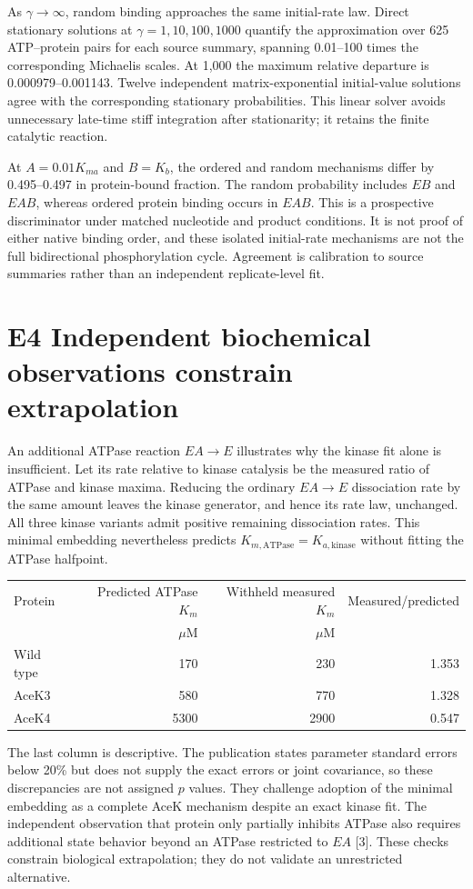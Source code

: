 \documentclass[11pt]{article}
\begin{document}
As $\gamma\to\infty$, random binding approaches the same initial-rate law. Direct stationary solutions at $\gamma=1,10,100,1000$ quantify the approximation over 625 ATP--protein pairs for each source summary, spanning 0.01--100 times the corresponding Michaelis scales. At 1,000 the maximum relative departure is 0.000979--0.001143. Twelve independent matrix-exponential initial-value solutions agree with the corresponding stationary probabilities. This linear solver avoids unnecessary late-time stiff integration after stationarity; it retains the finite catalytic reaction.

At $A=0.01K_{ma}$ and $B=K_b$, the ordered and random mechanisms differ by 0.495--0.497 in protein-bound fraction. The random probability includes $EB$ and $EAB$, whereas ordered protein binding occurs in $EAB$. This is a prospective discriminator under matched nucleotide and product conditions. It is not proof of either native binding order, and these isolated initial-rate mechanisms are not the full bidirectional phosphorylation cycle. Agreement is calibration to source summaries rather than an independent replicate-level fit.

\section*{E4 Independent biochemical observations constrain extrapolation}
An additional ATPase reaction $EA\to E$ illustrates why the kinase fit alone is insufficient. Let its rate relative to kinase catalysis be the measured ratio of ATPase and kinase maxima. Reducing the ordinary $EA\to E$ dissociation rate by the same amount leaves the kinase generator, and hence its rate law, unchanged. All three kinase variants admit positive remaining dissociation rates. This minimal embedding nevertheless predicts $K_{m,\mathrm{ATPase}}=K_{a,\mathrm{kinase}}$ without fitting the ATPase halfpoint.
\begin{center}\small
\begin{tabular}{lrrr}\toprule
Protein & Predicted ATPase $K_m$ & Withheld measured $K_m$ & Measured/predicted\\
 & $\mu$M & $\mu$M & \\\midrule
Wild type & 170 & 230 & 1.353\\
AceK3 & 580 & 770 & 1.328\\
AceK4 & 5300 & 2900 & 0.547\\\bottomrule
\end{tabular}
\end{center}
The last column is descriptive. The publication states parameter standard errors below 20\% but does not supply the exact errors or joint covariance, so these discrepancies are not assigned $p$ values. They challenge adoption of the minimal embedding as a complete AceK mechanism despite an exact kinase fit. The independent observation that protein only partially inhibits ATPase also requires additional state behavior beyond an ATPase restricted to $EA$ [3]. These checks constrain biological extrapolation; they do not validate an unrestricted alternative.
\end{document}
